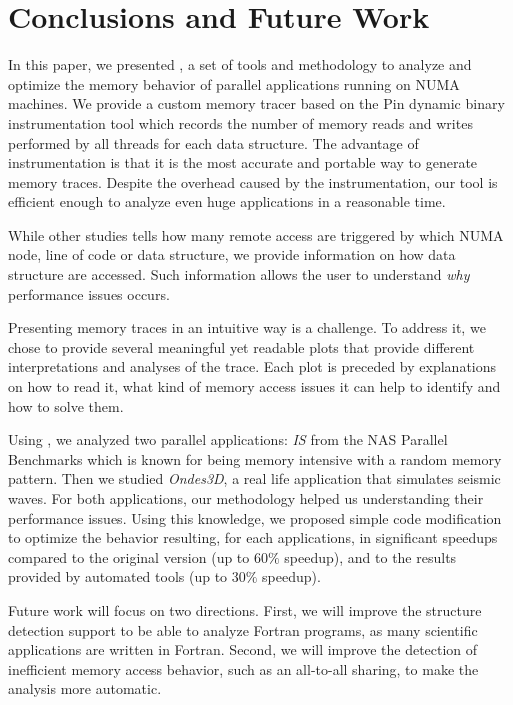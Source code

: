 
\section{Conclusions and Future Work}
\label{sec:concl}

In this paper, we presented \TABARNAC, a set of tools and methodology to analyze and
optimize the memory behavior of parallel applications running on NUMA
machines. We provide a custom memory tracer
based on the Pin dynamic binary instrumentation tool which records the
number of memory reads and writes performed by all threads for each data structure.
The advantage of instrumentation is that it is the most
accurate and portable way to generate memory traces.
Despite the overhead caused by the instrumentation, our tool is efficient enough to analyze even huge applications in a reasonable time.

While other studies tells how many remote access are triggered by which NUMA
node, line of code or data structure, we provide information on how data
structure are accessed. Such information allows the user to understand
\emph{why} performance issues occurs.

Presenting memory traces in an intuitive way is a challenge. To address it, we
chose to provide several meaningful yet readable plots that provide different
interpretations and analyses of the trace. Each plot is preceded by
explanations on how to read it, what kind of memory access issues it can help
to identify and how to solve them.

Using \TABARNAC, we analyzed two parallel applications: \emph{IS} from the NAS
Parallel Benchmarks which is known for being memory intensive with a random
memory pattern. Then we studied \emph{Ondes3D}, a real life application that
simulates seismic waves. For both applications, our methodology helped us
understanding their performance issues.  Using this knowledge, we proposed
simple code modification to optimize the behavior resulting, for each
applications, in significant speedups compared to the original version (up to
$60\%$ speedup), and to the results provided by automated tools (up to $30\%$
speedup).

Future work will focus on two directions. First, we will improve the
structure detection support to be able to analyze Fortran programs, as many
scientific applications are written in Fortran. Second, we will improve the
detection of inefficient memory access behavior, such as an all-to-all
sharing, to make the analysis more automatic.
